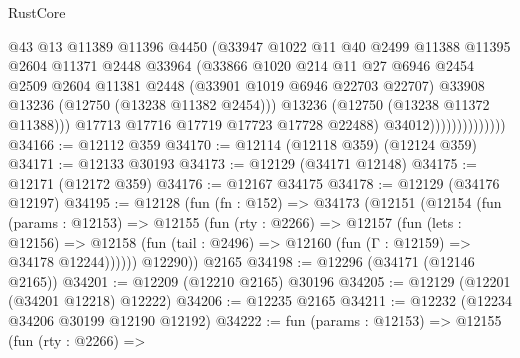 \begin{lexlean}{RustCore}
\begin{coremodule}
                                  @43
                                  @13
                                  @11389
                                  @11396
                                  @4450
                                  (@33947
                                    @1022
                                    @11
                                    @40
                                    @2499
                                    @11388
                                    @11395
                                    @2604
                                    @11371
                                    @2448
                                    @33964
                                    (@33866
                                      @1020
                                      @214
                                      @11
                                      @27
                                      @6946
                                      @2454
                                      @2509
                                      @2604
                                      @11381
                                      @2448
                                      (@33901 @1019 @6946 @22703 @22707)
                                      @33908
                                      @13236
                                      (@12750 (@13238 @11382 @2454)))
                                    @13236
                                    (@12750 (@13238 @11372 @11388)))
                                  @17713
                                  @17716
                                  @17719
                                  @17723
                                  @17728
                                  @22488)
                                @34012))))))))))))))
@34166 := @12112 @359
@34170 := @12114 (@12118 @359) (@12124 @359)
@34171 := @12133 @30193
@34173 := @12129 (@34171 @12148)
@34175 := @12171 (@12172 @359)
@34176 := @12167 @34175
@34178 := @12129 (@34176 @12197)
@34195 := @12128
    (fun (fn : @152) =>
    @34173
      (@12151
        (@12154
          (fun (params : @12153) =>
          @12155
            (fun (rty : @2266) =>
            @12157
              (fun (lets : @12156) =>
              @12158 (fun (tail : @2496) => @12160 (fun (Γ : @12159) => @34178 @12244))))))
        @12290))
    @2165
@34198 := @12296 (@34171 (@12146 @2165))
@34201 := @12209 (@12210 @2165) @30196
@34205 := @12129 (@12201 (@34201 @12218) @12222)
@34206 := @12235 @2165
@34211 := @12232 (@12234 @34206 @30199 @12190 @12192)
@34222 := fun (params : @12153) =>
  @12155
    (fun (rty : @2266) =>

\end{coremodule}
\end{lexlean}
